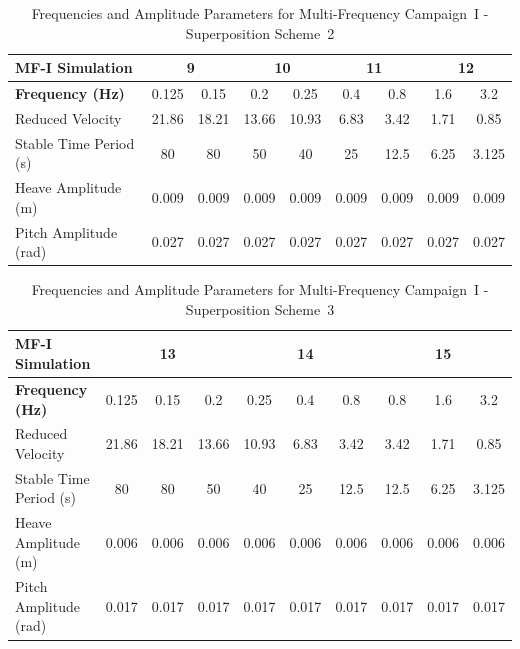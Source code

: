 \documentclass[../main]{subfiles}
\begin{document}
\begin{table}[htbp]
\centering
\caption{Frequencies and Amplitude Parameters for Multi-Frequency Campaign~I - Superposition Scheme~2}
\label{tab:MF-I_SP2}
\begin{tabular}{|l|cc|cc|cc|cc|}
\hline
\rule{0pt}{12pt}\textbf{MF-I Simulation} & \multicolumn{2}{c|}{9} & \multicolumn{2}{c|}{10} & \multicolumn{2}{c|}{11} & \multicolumn{2}{c|}{12} \\[4pt]
\hline
\rule{0pt}{12pt}\textbf{Frequency (Hz)} & 0.125 & 0.15 & 0.2 & 0.25 & 0.4 & 0.8 & 1.6 & 3.2 \\[4pt]
\hline
Reduced Velocity        & 21.86 & 18.21 & 13.66 & 10.93 & 6.83 & 3.42 & 1.71 & 0.85 \\
Stable Time Period (s)  & 80    & 80    & 50    & 40    & 25   & 12.5 & 6.25 & 3.125 \\
Heave Amplitude (m)     & 0.009 & 0.009 & 0.009 & 0.009 & 0.009 & 0.009 & 0.009 & 0.009 \\
Pitch Amplitude (rad)   & 0.027 & 0.027 & 0.027 & 0.027 & 0.027 & 0.027 & 0.027 & 0.027 \\
\hline
\end{tabular}
\end{table}

\begin{table}[htbp]
\centering
\caption{Frequencies and Amplitude Parameters for Multi-Frequency Campaign~I - Superposition Scheme~3}
\label{tab:MF-I_SP3}
\begin{tabular}{|l|ccc|ccc|ccc|}
\hline
\rule{0pt}{12pt}\textbf{MF-I Simulation} & \multicolumn{3}{c|}{13} & \multicolumn{3}{c|}{14} & \multicolumn{3}{c|}{15} \\[4pt]
\hline
\rule{0pt}{12pt}\textbf{Frequency (Hz)} & 0.125 & 0.15 & 0.2 & 0.25 & 0.4 & 0.8 & 0.8 & 1.6 & 3.2 \\[4pt]
\hline
Reduced Velocity        & 21.86 & 18.21 & 13.66 & 10.93 & 6.83 & 3.42 & 3.42 & 1.71 & 0.85 \\
Stable Time Period (s)  & 80    & 80    & 50    & 40    & 25   & 12.5 & 12.5 & 6.25 & 3.125 \\
Heave Amplitude (m)     & 0.006 & 0.006 & 0.006 & 0.006 & 0.006 & 0.006 & 0.006 & 0.006 & 0.006 \\
Pitch Amplitude (rad)   & 0.017 & 0.017 & 0.017 & 0.017 & 0.017 & 0.017 & 0.017 & 0.017 & 0.017 \\
\hline
\end{tabular}
\end{table}
\end{document}
